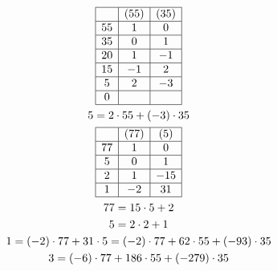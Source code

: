\begin{bsp*}
	\begin{gather*}
		\begin{array}{ | c | c | c | }
			\hline
				&(55)	&(35)	\\ \hline
			55	&1	&0	\\ \hline
			35	&0	&1	\\ \hline
			20	&1	&-1	\\ \hline
			15	&-1	&2	\\ \hline
			5	&2	&-3	\\ \hline
			0	&	&	\\ \hline
		\end{array} \\
		5 = 2 \cdot 55 + (-3) \cdot 35 \\
		\begin{array}{ | c | c | c | }
			\hline
				&(77)	&(5)	\\ \hline
			77	&1	&0	\\ \hline
			5	&0	&1	\\ \hline
			2	&1	&-15	\\ \hline
			1	&-2	&31	\\ \hline
		\end{array} \\
		77 = 15 \cdot 5 + 2 \\
		5 = 2 \cdot 2 + 1 \\
		1 = (-2) \cdot 77 + 31 \cdot 5 = (-2) \cdot 77 + 62 \cdot 55 + (-93) \cdot 35 \\
		3 = (-6) \cdot 77 + 186 \cdot 55 + (-279) \cdot 35
	\end{gather*}
\end{bsp*}
